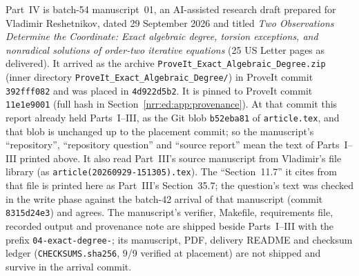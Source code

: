\documentclass[11pt,letterpaper]{article}
\theoremstyle{definition}
\theoremstyle{remark}
\begin{document}
Part~IV is batch-54 manuscript~01, an AI-assisted research draft prepared
for Vladimir Reshetnikov, dated 29 September 2026 and titled \emph{Two
Observations Determine the Coordinate: Exact algebraic degree, torsion
exceptions, and nonradical solutions of order-two iterative equations}
(25 US Letter pages as delivered). It arrived as the archive
\texttt{ProveIt\_Exact\_Algebraic\_Degree.zip} (inner directory
\texttt{ProveIt\_Exact\_Algebraic\_Degree/}) in ProveIt commit
\texttt{392fff082} and was placed in \texttt{4d922d5b2}. It is pinned to
ProveIt commit \texttt{11e1e9001} (full hash in
Section~\ref{nrr:ed:app:provenance}). At that commit this report already held
Parts~I--III, as the Git blob \texttt{b52eba81} of \texttt{article.tex}, and
that blob is unchanged up to the placement commit; so the manuscript's
``repository'', ``repository question'' and ``source report'' mean the text
of Parts~I--III printed above. It also read Part~III's source manuscript from
Vladimir's file library (as \nolinkurl{article(20260929-151305).tex}). The
``Section~11.7'' it cites from that file is printed here as Part~III's
Section~35.7; the question's text was checked in the write phase against the
batch-42 arrival of that manuscript (commit \texttt{8315d24e3}) and agrees.
The manuscript's verifier, Makefile, requirements file, recorded output and
provenance note are shipped beside Parts~I--III with the prefix
\nolinkurl{04-exact-degree-}; its manuscript, PDF, delivery README and
checksum ledger (\texttt{CHECKSUMS.sha256}, 9/9 verified at placement) are
not shipped and survive in the arrival commit.
\end{document}
